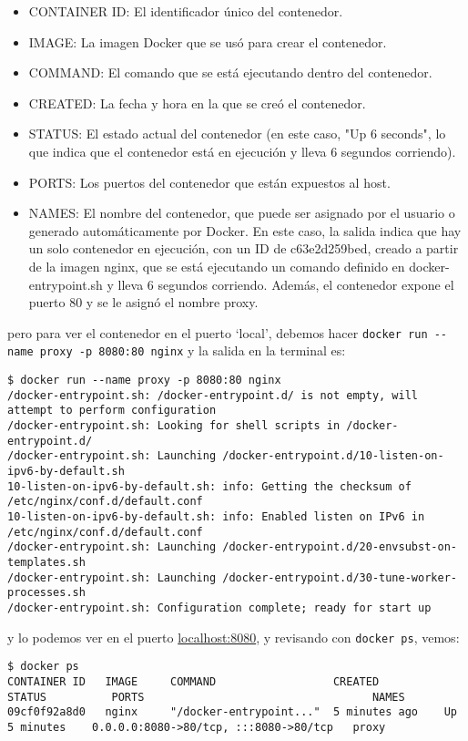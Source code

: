 \documentclass{article}
\begin{document}
\begin{itemize}
      \item CONTAINER ID: El identificador único del contenedor.
      \item IMAGE: La imagen Docker que se usó para crear el contenedor.
      \item COMMAND: El comando que se está ejecutando dentro del contenedor.
      \item CREATED: La fecha y hora en la que se creó el contenedor.
      \item STATUS: El estado actual del contenedor (en este caso, "Up 6 seconds", lo que indica que el contenedor está en ejecución y lleva 6 segundos corriendo).
      \item PORTS: Los puertos del contenedor que están expuestos al host.
      \item NAMES: El nombre del contenedor, que puede ser asignado por el usuario o generado automáticamente por Docker.
      En este caso, la salida indica que hay un solo contenedor en ejecución, con un ID de c63e2d259bed, creado a partir de la imagen nginx, que se está ejecutando un comando definido en docker-entrypoint.sh y lleva 6 segundos corriendo. Además, el contenedor expone el puerto 80 y se le asignó el nombre proxy.
\end{itemize}
pero para ver el contenedor en el puerto \enquote*{local}, debemos hacer \lstinline{docker run --name proxy -p 8080:80 nginx}
y la salida en la terminal es:
\begin{lstlisting}[numbers=none]
$ docker run --name proxy -p 8080:80 nginx
/docker-entrypoint.sh: /docker-entrypoint.d/ is not empty, will attempt to perform configuration
/docker-entrypoint.sh: Looking for shell scripts in /docker-entrypoint.d/
/docker-entrypoint.sh: Launching /docker-entrypoint.d/10-listen-on-ipv6-by-default.sh
10-listen-on-ipv6-by-default.sh: info: Getting the checksum of /etc/nginx/conf.d/default.conf
10-listen-on-ipv6-by-default.sh: info: Enabled listen on IPv6 in /etc/nginx/conf.d/default.conf
/docker-entrypoint.sh: Launching /docker-entrypoint.d/20-envsubst-on-templates.sh
/docker-entrypoint.sh: Launching /docker-entrypoint.d/30-tune-worker-processes.sh
/docker-entrypoint.sh: Configuration complete; ready for start up
\end{lstlisting}
y lo podemos ver en el puerto \href{http://localhost:8080/}{localhost:8080}, y revisando con \lstinline{docker ps}, vemos:
\begin{lstlisting}[numbers=none]
$ docker ps
CONTAINER ID   IMAGE     COMMAND                  CREATED          STATUS          PORTS                                   NAMES
09cf0f92a8d0   nginx     "/docker-entrypoint..."  5 minutes ago    Up 5 minutes    0.0.0.0:8080->80/tcp, :::8080->80/tcp   proxy      
\end{lstlisting}
\end{document}

